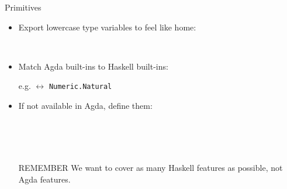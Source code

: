 \documentclass[aspectratio=169]{beamer}
\newcommand\hs[1]{\texttt{#1}}
\begin{document}
\begin{frame}[fragile]{Primitives}

\begin{itemize}
\item Export lowercase type variables to feel like home:
\begin{code}%
\>[0]\AgdaSpace{}%
\AgdaSymbol{:}\AgdaSpace{}%
\AgdaSpace{}%
\AgdaSpace{}%
\<%
\\
\>[0]\AgdaSpace{}%
\AgdaSpace{}%
\AgdaSymbol{=}\AgdaSpace{}%
\<%
\end{code}

\pause
\item Match Agda built-ins to Haskell built-ins:

e.g.  $\leftrightarrow$ \hs{Numeric.Natural}

\pause
\item If not available in Agda, define them:

\begin{code}%
\>[0]\AgdaSpace{}%
\AgdaSpace{}%
\<%
\\
\>[0]\AgdaSpace{}%
\AgdaSymbol{:}\AgdaSpace{}%
\AgdaSpace{}%
\AgdaSpace{}%
\AgdaSpace{}%
\AgdaSpace{}%
\AgdaSpace{}%
\AgdaSpace{}%
\<%
\\
\>[0]\AgdaSpace{}%
\AgdaSpace{}%
\AgdaSpace{}%
\AgdaSpace{}%
\AgdaSpace{}%
\AgdaSpace{}%
\AgdaSymbol{=}\AgdaSpace{}%
\<%
\\
\>[0]\AgdaSpace{}%
%
\>[9]\AgdaSpace{}%
\AgdaSpace{}%
\AgdaSpace{}%
\AgdaSpace{}%
\AgdaSymbol{=}\AgdaSpace{}%
\<%
\end{code}

\pause
\begin{alertblock}{REMEMBER}
We want to cover as many Haskell features as possible, not Agda features.
\end{alertblock}

\end{itemize}

\end{frame}
\end{document}
